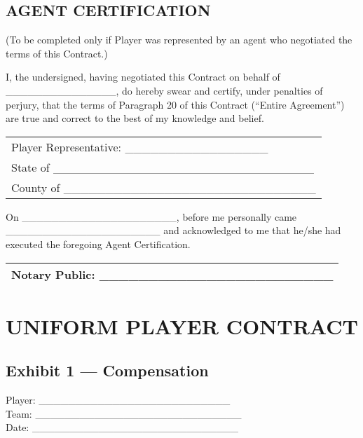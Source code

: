 \documentclass[
]{book}
\begin{document}
\newpage

\hypertarget{agent-certification}{%
\subsection{AGENT CERTIFICATION}\label{agent-certification}}

(To be completed only if Player was represented by an agent who negotiated the terms of this Contract.)

I, the undersigned, having negotiated this Contract on behalf of \_\_\_\_\_\_\_\_\_\_\_\_\_\_\_, do hereby swear and certify, under penalties of perjury, that the terms of Paragraph 20 of this Contract (``Entire Agreement'') are true and correct to the best of my knowledge and belief.

\begin{longtable}[]{@{}l@{}}
\toprule()
\endhead
Player Representative: \_\_\_\_\_\_\_\_\_\_\_\_\_\_\_\_\_ \\
State of \_\_\_\_\_\_\_\_\_\_\_\_\_\_\_\_\_\_\_\_\_\_\_\_\_\_\_\_\_\_\_ \\
County of \_\_\_\_\_\_\_\_\_\_\_\_\_\_\_\_\_\_\_\_\_\_\_\_\_\_\_\_\_\_ \\
\bottomrule()
\end{longtable}

On \_\_\_\_\_\_\_\_\_\_\_\_\_\_\_\_\_\_\_\_\_, before me personally came \_\_\_\_\_\_\_\_\_\_\_\_\_\_\_\_\_\_\_\_\_ and acknowledged to me that he/she had executed the foregoing Agent Certification.

\begin{longtable}[]{@{}l@{}}
\toprule()
\endhead
Notary Public: \_\_\_\_\_\_\_\_\_\_\_\_\_\_\_\_\_\_\_\_\_\_\_\_ \\
\bottomrule()
\end{longtable}

\newpage

\hypertarget{uniform-player-contract-1}{%
\section{UNIFORM PLAYER CONTRACT}\label{uniform-player-contract-1}}

\hypertarget{exhibit-1-compensation}{%
\subsection{Exhibit 1 --- Compensation}\label{exhibit-1-compensation}}

Player: \_\_\_\_\_\_\_\_\_\_\_\_\_\_\_\_\_\_\_\_\_\_\_\_\_\_\\
Team: \_\_\_\_\_\_\_\_\_\_\_\_\_\_\_\_\_\_\_\_\_\_\_\_\_\_\_\_\\
Date: \_\_\_\_\_\_\_\_\_\_\_\_\_\_\_\_\_\_\_\_\_\_\_\_\_\_\_\_
\end{document}

